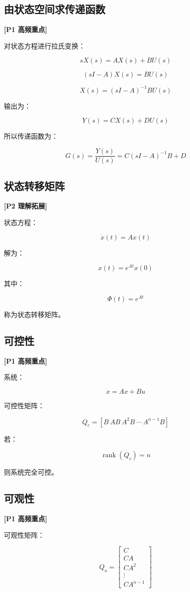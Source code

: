 \documentclass[UTF8,a4paper,12pt]{ctexart}
\newcommand{\Pone}{\textcolor{p1}{\textbf{[P1 高频重点]}}}
\newcommand{\Ptwo}{\textcolor{p2}{\textbf{[P2 理解拓展]}}}
\begin{document}
\subsection{由状态空间求传递函数}

\Pone

对状态方程进行拉氏变换：

\[
sX(s)=AX(s)+BU(s)
\]

\[
(sI-A)X(s)=BU(s)
\]

\[
X(s)=(sI-A)^{-1}BU(s)
\]

输出为：

\[
Y(s)=CX(s)+DU(s)
\]

所以传递函数为：

\[
G(s)=\frac{Y(s)}{U(s)}=C(sI-A)^{-1}B+D
\]

\subsection{状态转移矩阵}

\Ptwo

状态方程：

\[
\dot{x}(t)=Ax(t)
\]

解为：

\[
x(t)=e^{At}x(0)
\]

其中：

\[
\Phi(t)=e^{At}
\]

称为状态转移矩阵。

\subsection{可控性}

\Pone

系统：

\[
\dot{x}=Ax+Bu
\]

可控性矩阵：

\[
Q_c=[B\ AB\ A^2B\ \cdots\ A^{n-1}B]
\]

若：

\[
\operatorname{rank}(Q_c)=n
\]

则系统完全可控。

\subsection{可观性}

\Pone

可观性矩阵：

\[
Q_o=
\begin{bmatrix}
C\\
CA\\
CA^2\\
\vdots\\
CA^{n-1}
\end{bmatrix}
\]
\end{document}
